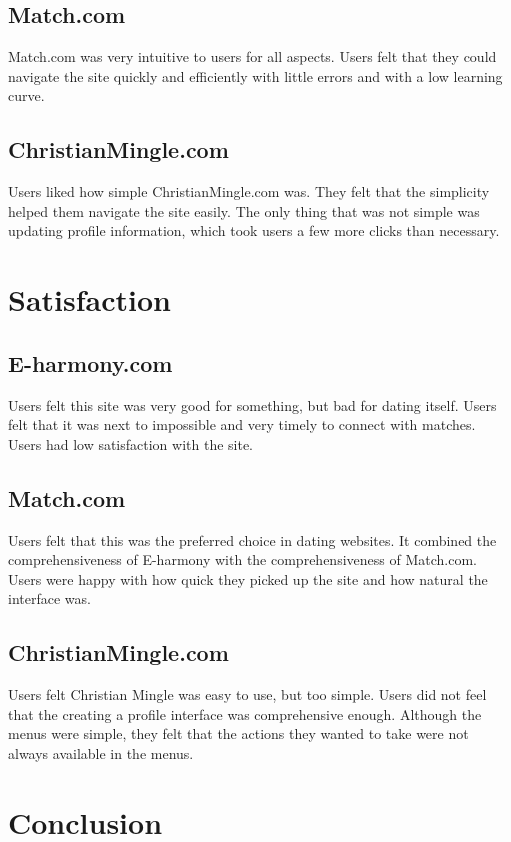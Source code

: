 \documentclass{article}
\begin{document}
\subsection{Match.com}
Match.com was very intuitive to users for all aspects. Users felt that they could navigate the site quickly and efficiently with little errors and with a low learning curve.

\subsection{ChristianMingle.com}
Users liked how simple ChristianMingle.com was. They felt that the simplicity helped them navigate the site easily. The only thing that was not simple was updating profile information, which took users a few more clicks than necessary.


\section{Satisfaction}
\subsection{E-harmony.com}
Users felt this site was very good for something, but bad for dating itself. Users felt that it was next to impossible and very timely to connect with matches. Users had low satisfaction with the site.


\subsection{Match.com}
	Users felt that this was the preferred choice in dating websites. It combined the comprehensiveness of E-harmony with the comprehensiveness of Match.com. Users were happy with how quick they picked up the site and how natural the interface was.

\subsection{ChristianMingle.com}
Users felt Christian Mingle was easy to use, but too simple. Users did not feel that the creating a profile interface was comprehensive enough. Although the menus were simple, they felt that the actions they wanted to take were not always available in the menus.

\section{Conclusion}
\end{document}
